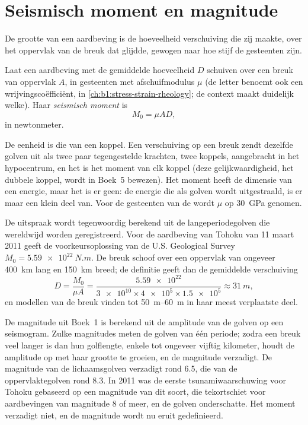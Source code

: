\section{Seismisch moment en magnitude}\label{sec:b1:earthquake-source:moment}

De grootte van een aardbeving is de hoeveelheid verschuiving die zij maakte, over het oppervlak van de breuk dat glijdde, gewogen naar hoe stijf de gesteenten zijn.

\begin{definition}\label{def:b1:earthquake-source:moment}
Laat een aardbeving met de gemiddelde hoeveelheid $D$ schuiven over een breuk van oppervlak $A$, in gesteenten met afschuifmodulus $\mu$ (de letter benoemt ook een wrijvingscoëfficiënt, in \cref{ch:b1:stress-strain-rheology}; de context maakt duidelijk welke). Haar \emph{seismisch moment} is
\[
  M_0 = \mu A D ,
\]
in newtonmeter.
\end{definition}

De eenheid is die van een koppel. Een verschuiving op een breuk zendt dezelfde golven uit als twee paar tegengestelde krachten, twee koppels, aangebracht in het hypocentrum, en het  is het moment van elk koppel (deze gelijkwaardigheid, het dubbele koppel, wordt in Boek~5 bewezen). Het moment heeft de dimensie van een energie, maar het is er geen: de energie die als golven wordt uitgestraald, is er maar een klein deel van. Voor de gesteenten van de  wordt $\mu$ op \qty{30}{GPa} genomen.

De uitspraak wordt tegenwoordig berekend uit de langeperiodegolven die wereldwijd worden geregistreerd. Voor de aardbeving van Tohoku van 11 maart 2011 geeft de voorkeursoplossing van de U.S. Geological Survey $M_0 = \qty{5.59e22}{N.m}$. De breuk schoof over een oppervlak van ongeveer \qty{400}{km} lang en \qty{150}{km} breed; de definitie geeft dan de gemiddelde verschuiving
\[
  D = \frac{M_0}{\mu A}
    = \frac{\num{5.59e22}}{\num{3e10}\times\num{4e5}\times\num{1.5e5}}
    \approx \qty{31}{m} ,
\]
en modellen van de breuk vinden tot \qtyrange{50}{60}{m} in haar meest verplaatste deel.

De magnitude uit Boek~1 is berekend uit de amplitude van de golven op een seismogram. Zulke magnitudes meten de golven van één periode; zodra een breuk veel langer is dan hun golflengte, enkele tot ongeveer vijftig kilometer, houdt de amplitude op met haar grootte te groeien, en de magnitude verzadigt. De magnitude van de lichaamsgolven verzadigt rond 6.5, die van de oppervlaktegolven rond 8.3. In 2011 was de eerste tsunamiwaarschuwing voor Tohoku gebaseerd op een magnitude van dit soort, die tekortschiet voor aardbevingen van magnitude 8 of meer, en de golven onderschatte. Het moment verzadigt niet, en de magnitude wordt nu eruit gedefinieerd.

